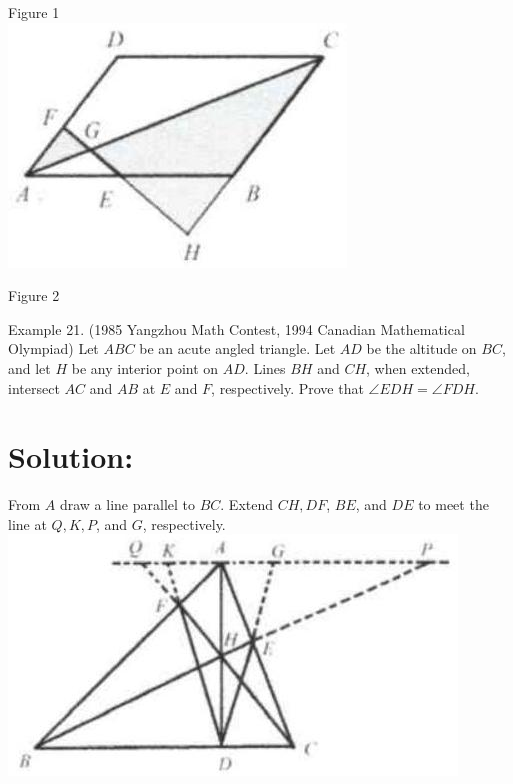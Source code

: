 \documentclass[10pt]{article}
\begin{document}
Figure 1\\
\includegraphics[max width=\textwidth, center]{2025_04_17_97bc1f7e44d93c271a88g-124(2)}

Figure 2

Example 21. (1985 Yangzhou Math Contest, 1994 Canadian Mathematical Olympiad) Let \(A B C\) be an acute angled triangle. Let \(A D\) be the altitude on \(B C\), and let \(H\) be any interior point on \(A D\). Lines \(B H\) and \(C H\), when extended, intersect \(A C\) and \(A B\) at \(E\) and \(F\), respectively. Prove that \(\angle E D H=\angle F D H\).

\section*{Solution:}
From \(A\) draw a line parallel to \(B C\). Extend \(C H, D F\), \(B E\), and \(D E\) to meet the line at \(Q, K, P\), and \(G\), respectively.\\
\includegraphics[max width=\textwidth, center]{2025_04_17_97bc1f7e44d93c271a88g-124(1)}
\end{document}
